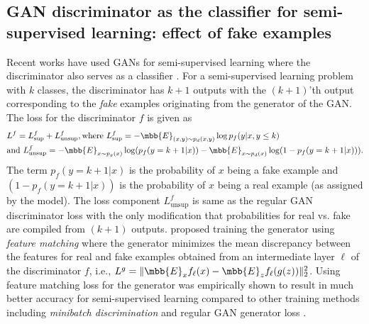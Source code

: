 \documentclass{article}
\begin{document}
\subsection{GAN discriminator as the classifier for semi-supervised learning: effect of fake examples}

Recent works have used GANs for semi-supervised learning where the discriminator also serves as a classifier \cite{salimans2016improved,dumoulin2016adversarially,odena2016semi}. For a semi-supervised learning problem with $k$ classes, the discriminator has $k+1$ outputs with the $(k+1)$'th output corresponding to the \emph{fake} examples originating from the generator of the GAN. The loss for the discriminator $f$ is given as \cite{salimans2016improved}\begin{align}
\begin{split}
& L^f = L^f_{\text{sup}} + L^f_{\text{unsup}}, \text{where } L^f_{\text{sup}} = -\mbb{E}_{(x,y)\sim p_d(x,y)} \log p_{f}(y|x, y\leq k) \\
& \text{and } L^f_{\text{unsup}} =  -\mbb{E}_{x\sim p_g(x)} \log (p_f(y=k+1|x)) - \mbb{E}_{x\sim p_d(x)} \log (1- p_f(y=k+1|x))).
\end{split}
\label{eq:semisupganloss}
\end{align}
The term $p_f(y=k+1|x)$ is the probability of $x$ being a fake example and $(1-p_f(y=k+1|x))$ is the probability of $x$ being a real example (as assigned by the model). The loss component $L^f_{\text{unsup}}$ is same as the regular GAN discriminator loss with the only modification that probabilities for real vs. fake are compiled from $(k+1)$ outputs. \citet{salimans2016improved} proposed training the generator using \emph{feature matching} where the generator minimizes the mean discrepancy between the features for real and fake examples obtained from an intermediate layer $\ell$ of the discriminator $f$, i.e., $L^g = \lVert \mbb{E}_x f_{\ell}(x) - \mbb{E}_z f_{\ell}(g(z))\rVert_2^2$. Using feature matching loss for the generator was empirically shown to result in much better accuracy for semi-supervised learning compared to other training methods including \emph{minibatch discrimination} and regular GAN generator loss \cite{salimans2016improved}. 
\end{document}
